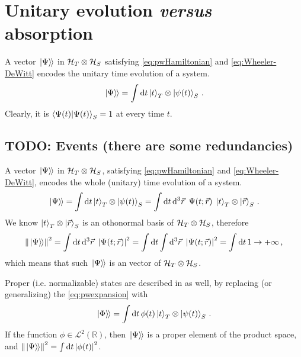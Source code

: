 \section{Unitary evolution \emph{versus} absorption}

A vector $\left.\left| \Psi \right\rangle\hspace{-0.115em}\right\rangle$ in $\mathcal{H}_T \otimes \mathcal{H}_S$
satisfying \eqref{eq:pwHamiltonian} and \eqref{eq:Wheeler-DeWitt}
encodes the unitary time evolution of a system.
\begin{equation}\label{eq:pwexpansion}
  \left.\left| \Psi \right\rangle\hspace{-0.115em}\right\rangle =
    \int \dd{t} \ket{t}_T \otimes \ket{\psi(t)}_S
    \,  \text{.}
\end{equation}
Clearly, it is $\braket{\Psi(t)}_S = 1$ at every time $t$.


\subsection{TODO: Events (there are some redundancies)}

A vector $\left.\left| \Psi \right\rangle\hspace{-0.115em}\right\rangle$ in $\mathcal{H}_T \otimes \mathcal{H}_S$,
satisfying \eqref{eq:pwHamiltonian} and \eqref{eq:Wheeler-DeWitt},
encodes the whole (unitary) time evolution of a system.
\begin{equation}\label{eq:pwexpansion}
  \left.\left| \Psi \right\rangle\hspace{-0.115em}\right\rangle =
    \int \dd{t} \ket{t}_T \otimes \ket{\psi(t)}_S =
    \int \dd{t}\dd[3]{\vec{r}} \ \Psi(t; \vec{r}) \; \ket{t}_T \otimes \ket{\vec{r}}_S
    \,  \text{.}
\end{equation}
We know $\ket{t}_T \otimes \ket{\vec{r}}_S$ is an othonormal basis of $\mathcal{H}_T \otimes \mathcal{H}_S$, therefore
\begin{equation}
  \norm{\left.\left| \Psi \right\rangle\hspace{-0.115em}\right\rangle}^2 =
    \int \dd{t}\dd[3]{\vec{r}} \ \abs{\Psi(t; \vec{r})}^2 =
    \int \dd{t} \int \dd[3]{\vec{r}} \ \abs{\Psi(t; \vec{r})}^2 =
    \int \dd{t} 1 \rightarrow +\infty
    \,  \text{,}
\end{equation}
which means that such $\left.\left| \Psi \right\rangle\hspace{-0.115em}\right\rangle$ is an  vector of $\mathcal{H}_T \otimes \mathcal{H}_S$.

Proper (i.e. normalizable) states are described in \cite{Lloyd:Time} as well, by replacing (or generalizing)
the \eqref{eq:pwexpansion} with
\begin{equation}\label{eq:pwphi}
  \left.\left| \Phi \right\rangle\hspace{-0.115em}\right\rangle =
    \int \dd{t} \phi(t) \ket{t}_T \otimes \ket{\psi(t)}_S \, \text{.}
\end{equation}
If the function $\phi \in \mathcal{L}^2(\mathbb{R})$,
then $\left.\left| \Psi \right\rangle\hspace{-0.115em}\right\rangle$ is a proper element of the product space,
and $\norm{\left.\left| \Psi \right\rangle\hspace{-0.115em}\right\rangle}^2 = \int \dd{t} \abs{\phi(t)}^2$.

